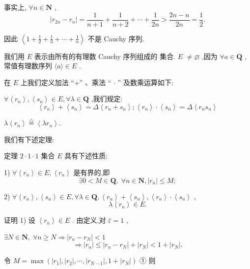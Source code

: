 事实上, $\forall n \in  \mathbf{N}$ ,
$$\left| {{r}_{2n} - {r}_{n}}\right|  = \frac{1}{n + 1} + \frac{1}{n + 2} + \cdots  + \frac{1}{2n} > \frac{{2n} - n}{2n} = \frac{1}{2}.$$

因此 $\left\langle  {1 + \frac{1}{2} + \frac{1}{3} + \cdots  + \frac{1}{n}}\right\rangle$ 不是 Cauchy 序列.

我们用 $E$ 表示由所有的有理数 Cauchy 序列组成的 集合. $E$  $\neq  \varnothing$ ,因为 $\forall a \in  \mathbf{Q}$ ,常值有理数序列 $\langle a\rangle  \in  E$ .

在 $E$ 上我们定义加法 “+” 、乘法 “ $\cdot$ ” 及数乘运算如下:

$\forall \left\langle  {r}_{n}\right\rangle  ,\left\langle  {s}_{n}\right\rangle   \in  E,\forall \lambda  \in  \mathbf{Q}$ ,我们规定:
$$\left\langle  {r}_{n}\right\rangle   + \left\langle  {s}_{n}\right\rangle   = \Delta \left\langle  {{r}_{n} + {s}_{n}}\right\rangle  ;\left\langle  {r}_{n}\right\rangle   \cdot  \left\langle  {s}_{n}\right\rangle   = \Delta \left\langle  {{r}_{n}{s}_{n}}\right\rangle$$

$\lambda \left\langle  {r}_{n}\right\rangle  \overset{\bigtriangleup }{ = }\left\langle  {\lambda {r}_{n}}\right\rangle  .$

我们有下述定理:

定理 $2 \cdot  1 \cdot  1$ 集合 $E$ 具有下述性质:

1) $\forall \left\langle  {r}_{n}\right\rangle   \in  E,\left\langle  {r}_{n}\right\rangle$ 是有界的,即
$$\exists 0 < M \in  \mathbf{Q},\;\forall n \in  \mathbf{N},\left| {r}_{n}\right|  \leq  M;$$

2) $\forall \left\langle  {r}_{n}\right\rangle  ,\left\langle  {s}_{n}\right\rangle   \in  E,\forall \lambda  \in  \mathbf{Q},\left\langle  {r}_{n}\right\rangle   + \left\langle  {s}_{n}\right\rangle  ,\left\langle  {r}_{n}\right\rangle   \cdot  \left\langle  {s}_{n}\right\rangle$ ,
$$\lambda \left\langle  {r}_{n}\right\rangle   \in  E.$$

证明 1) 设 $\left\langle  {r}_{n}\right\rangle   \in  E$ . 由定义,对 $\bar{\varepsilon } = 1$ ,

$\exists N \in  \mathbf{N},\;\forall n \geq  N \Rightarrow  \left| {{r}_{n} - {r}_{N}}\right|  < 1$
$$\Rightarrow  \left| {r}_{n}\right|  \leq  \left| {{r}_{n} - {r}_{N}}\right|  + \left| {r}_{N}\right|  < 1 + \left| {r}_{N}\right| .$$

令 $M = \max \left( {\left| {r}_{1}\right| ,\left| {r}_{2}\right| ,\cdots ,\left| {r}_{N - 1}\right| ,1 + \left| {r}_{N}\right| }\right)$ ① 则

